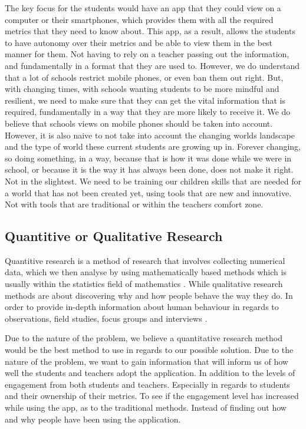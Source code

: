 \documentclass[sigchi]{acmart}
\begin{document}
The key focus for the students would have an app that they could view on a computer or their smartphones, which provides them with all the required metrics that they need to know about. This app, as a result, allows the students to have autonomy over their metrics and be able to view them in the best manner for them. Not having to rely on a teacher passing out the information, and fundamentally in a format that they are used to. However, we do understand that a lot of schools restrict mobile phones, or even ban them out right. But, with changing times, with schools wanting students to be more mindful and resilient, we need to make sure that they can get the vital information that is required, fundamentally in a way that they are more likely to receive it. We do believe that schools views on mobile phones should be taken into account. However, it is also naive to not take into account the changing worlds landscape and the type of world these current students are growing up in. Forever changing, so doing something, in a way, because that is how it was done while we were in school, or because it is the way it has always been done, does not make it right. Not in the slightest. We need to be training our children skills that are needed for a world that has not been created yet, using tools that are new and innovative. Not with tools that are traditional or within the teachers comfort zone.

\subsection{Quantitive  or Qualitative Research}
Quantitive research is a method of research that involves collecting numerical data, which we then analyse by using mathematically based methods which is usually within the statistics field of mathematics \cite{quantitivelectures}. While qualitative research methods are about discovering why and how people behave the way they do. In order to provide in-depth information about human behaviour in regards to observations, field studies, focus groups and interviews \cite{quantitivelectures}. 

Due to the nature of the problem, we believe a quantitative research method would be the best method to use in regards to our possible solution. Due to the nature of the problem, we want to gain information that will inform us of how well the students and teachers adopt the application. In addition to the levels of engagement from both students and teachers. Especially in regards to students and their ownership of their metrics. To see if the engagement level has increased while using the app, as to the traditional methods. Instead of finding out how and why people have been using the application.
\end{document}
